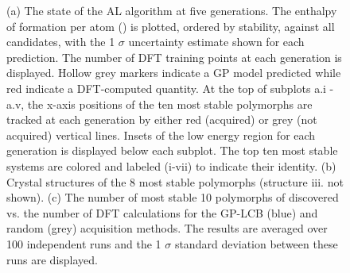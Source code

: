 \begin{figure}[!htb]
\centering
{}
\caption{\label{fig:iro3_al}
%
(a) The state of the AL algorithm at five generations.
%
The enthalpy of formation per atom (\DHf) is plotted, ordered by stability, against all \IrOthree candidates, with the 1 $\sigma$ uncertainty estimate shown for each prediction.
%
The number of DFT training points at each generation is displayed.
%
Hollow grey markers indicate a GP model predicted \DHf while red indicate a DFT-computed quantity.
%
At the top of subplots a.i - a.v, the x-axis positions of the ten most stable polymorphs are tracked at each generation by either red (acquired) or grey (not acquired) vertical lines.
%
Insets of the low energy region for each generation is displayed below each subplot.
%
The top ten most stable systems are colored and labeled (i-vii) to indicate their identity.
%
(b) Crystal structures of the \num{8} most stable \IrOthree polymorphs (structure iii. not shown).
%
%
(c) The number of most stable \num{10} polymorphs of \IrOthree discovered vs. the number of DFT calculations for the GP-LCB (blue) and random (grey) acquisition methods.
%
The results are averaged over \num{100} independent runs and the 1 $\sigma$ standard deviation between these runs are displayed.
}
\end{figure}


